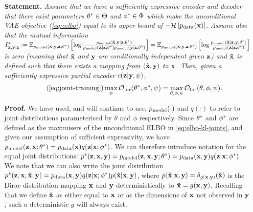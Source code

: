 \textbf{Statement.} \textit{Assume that we have a sufficiently expressive
  encoder and decoder that there exist parameters ${\theta}^*\in\Theta$
  and ${\phi}^*\in\Phi$ which make the unconditional VAE objective
  (\cref{eq:eelbo}) equal to its upper bound of $-\mathcal{H}\left[ p_{\rm{data}}(\mathbf{x})
  \right]$. Assume also that the mutual information ${I^*_{\mathbf{\tilde{x}}{},\mathbf{y}{}|\mathbf{z}{}}{} :=
  \mathbb{E}_{p_{\rm{model}}{}(\mathbf{\tilde{x}}{}, \mathbf{y}{}, \mathbf{z}{}; \theta^*)} \left[ \log
    \frac{p_{\rm{model}}{}(\mathbf{\tilde{x}}{},\mathbf{y}{}|\mathbf{z}{}; \theta^*) }{ p_{\rm{model}}{}(\mathbf{\tilde{x}}{}|\mathbf{z}{};
      \theta^*)p_{\rm{model}}{}(\mathbf{y}{}|\mathbf{z}{}; \theta^*) } \right] =
  \mathbb{E}_{p_{\rm{model}}{}(\mathbf{\tilde{x}}{}, \mathbf{y}{}, \mathbf{z}{}; \theta^*)} \left[ \log
    \frac{p_{\rm{model}}{}(\mathbf{\tilde{x}}{}|\mathbf{z}{}, \mathbf{y}{}; \theta^*) }{ p_{\rm{model}}{}(\mathbf{\tilde{x}}{}|\mathbf{z}{};
      \theta^*) } \right]}$ is zero (meaning that $\mathbf{\tilde{x}}{}$ and $\mathbf{y}{}$ are
  conditionally independent given $\mathbf{z}{}$) and $\mathbf{\tilde{x}}{}$ is defined such that there
  exists a mapping from $(\mathbf{\tilde{x}}{},\mathbf{y}{})$ to $\mathbf{x}{}$. Then, given a
  sufficiently expressive partial encoder $c{}(\mathbf{z}{}|\mathbf{y}{}; \psi)$, }
\begin{equation} \tag{\ref{eq:joint-training}}
  \max_{\partphi{}} \mathcal{O}_\mathrm{for}(\optimal{\theta}, \optimal{\phi}, \partphi{}) = \max_{\theta, \phi, \partphi{}} \mathcal{O}_\mathrm{for}(\theta, \phi, \partphi{}).
\end{equation}

\textbf{Proof.} We have used, and will continue to use, $p_{\rm{model}}{}(\cdot)$ and
$q(\cdot)$ to refer to joint distributions parameterised by $\theta$ and $\phi$
respectively. Since ${\theta}^*$ and ${\phi}^*$ are defined as the
maximisers of the unconditional ELBO in \cref{eq:elbo-kl-joints}, and given our
assumption of sufficient expressivity, we have $p_{\rm{model}}{}(\mathbf{z}{}, \mathbf{x}{};
{\theta}^*) = p_{\rm{data}}{}(\mathbf{x}{}) q(\mathbf{z}{}|\mathbf{x}{}; {\phi}^*)$. We can therefore
introduce notation for the equal joint distributions: ${p}^*(\mathbf{z}{}, \mathbf{x}{},
\mathbf{y}{}) = p_{\rm{model}}{}(\mathbf{z}{}, \mathbf{x}{}, \mathbf{y}{}; {\theta}^*) = p_{\rm{data}}{}(\mathbf{x}{},
\mathbf{y}{}) q(\mathbf{z}{}|\mathbf{x}{}; {\phi}^*)$. We note that we can also write the joint
distribution ${p}^*(\mathbf{z}{}, \mathbf{x}{}, \mathbf{\tilde{x}}{}, \mathbf{y}{}) = p_{\rm{data}}{}(\mathbf{x}{},
\mathbf{y}{}) q(\mathbf{z}{}|\mathbf{x}{}; {\phi}^*)p(\mathbf{\tilde{x}}{}|\mathbf{x}{},\mathbf{y}{})$, where
$p(\mathbf{\tilde{x}}{}|\mathbf{x}{},\mathbf{y}{})=\delta_{g(\mathbf{x}{},\mathbf{y}{})}(\mathbf{\tilde{x}}{})$ is the Dirac
distribution mapping $\mathbf{x}{}$ and $\mathbf{y}{}$ deterministically to
$\mathbf{\tilde{x}}{}=g(\mathbf{x}{},\mathbf{y}{})$.
%
Recalling that we define $\mathbf{\tilde{x}}{}$ as either equal to $\mathbf{x}{}$ or as the
dimensions of $\mathbf{x}{}$ not observed in $\mathbf{y}{}$, such a deterministic $g$ will
always exist.


